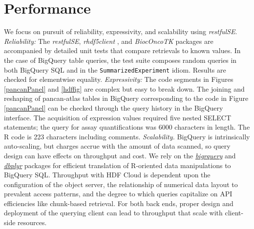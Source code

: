 \documentclass[applications]{gen-bioinformatics}
\newcommand{\Rpackage}[1]{{\textit{#1}}}
\newcommand{\Biocpackage}[1]{{\textit{#1}}}
\newcommand{\CRANpackage}[1]{{\emph{\href{https://cran.r-project.org/web/packages/#1/index.html}{#1}}}}
\newcommand{\CRANpackageFirst}[1]{{\emph{\href{https://cran.r-project.org/web/packages/#1/index.html}{#1}}}}
\begin{document}


\noindent



\section*{Performance}

We focus on pursuit of reliability,
expressivity, and scalability using \Biocpackage{restfulSE}.  
\textit{Reliability:} 
The \Biocpackage{restfulSE}, \Biocpackage{rhdf5client} \citep{rclient},
and \Biocpackage{BiocOncoTK} \citep{bionc} packages are accompanied by detailed unit
tests that compare retrievals to known values.  In the
case of BigQuery table queries, the test
suite composes random queries 
in both BigQuery SQL and in the \texttt{SummarizedExperiment} 
idiom.  Results
are checked for elementwise equality.  \textit{Expressivity:} The code
segments in Figures \ref{pancanPanel} and \ref{hdffig} are
complex but easy to break down.  The joining and
reshaping of pancan-atlas tables in BigQuery corresponding
to the code in Figure \ref{pancanPanel}
can be checked through the query history in the BigQuery
interface.  The acquisition of expression values required
five nested SELECT statements; the query for assay quantifications
was 6000 characters in length.
The R code is 223 characters including comments.
\textit{Scalability.}  BigQuery is intrinsically auto-scaling,
but charges accrue with the amount of data scanned, 
so query design can have effects on throughput
and cost.  We rely on the \CRANpackage{bigrquery} \citep{bigr} and \CRANpackageFirst{dbplyr} \citep{dbp} packages for
efficient translation of R-oriented data manipulations to 
BigQuery SQL.  Throughput with HDF Cloud 
is dependent upon the configuration of the object server,
the relationship of numerical data layout to prevalent access
patterns, and the degree to which queries capitalize on
API efficiencies like chunk-based retrieval.  For both
back ends, proper design and deployment of the querying client can
lead to throughput that scale with client-side resources.
\end{document}
